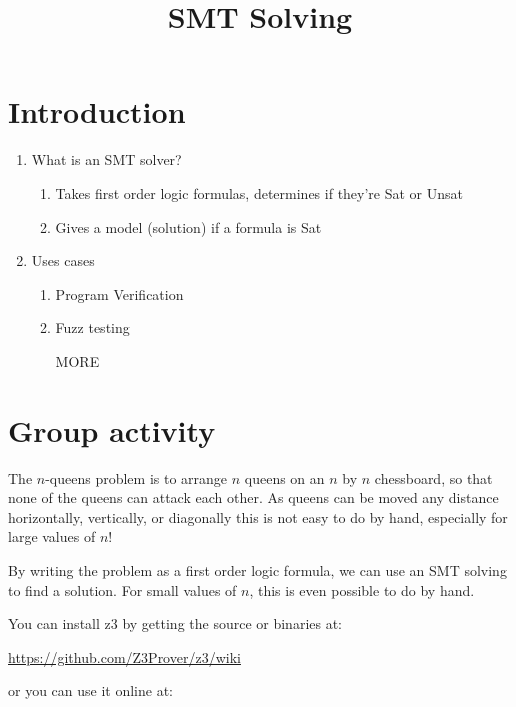 \documentclass{article}%
\begin{document}
\setlength{\pdfpageheight}{\paperheight}
\setlength{\pdfpagewidth}{\paperwidth}


\title{SMT Solving}
\maketitle

\section{Introduction}

\begin {enumerate}

	\item What is an SMT solver?
	\begin{enumerate}
		\item Takes first order logic formulas, determines if they're Sat or Unsat
		\item Gives a model (solution) if a formula is Sat
	\end{enumerate}

	\item Uses cases
	\begin{enumerate}
		\item Program Verification
		\item Fuzz testing
		\item [MORE]
	\end{enumerate}
	

\end {enumerate}

\section{Group activity}
	The $n$-queens problem is to arrange $n$ queens on an $n$ by $n$ chessboard, so that none of the queens can attack each other.
	As queens can be moved any distance horizontally, vertically, or diagonally this is not easy to do by hand, especially for large values of $n$!

	By writing the problem as a first order logic formula, we can use an SMT solving to find a solution.  For small values of $n$, this is even possible to do by hand.

	You can install z3 by getting the source or binaries at:
	
	\url{https://github.com/Z3Prover/z3/wiki}
	
	or you can use it online at:
	
\end{document}
